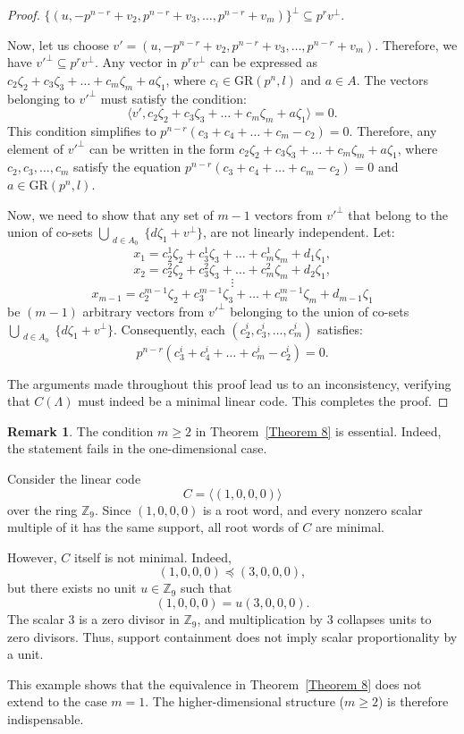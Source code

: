 \documentclass[10pt]{article}
\theoremstyle{definition}
\newtheorem{remark}[lem]{Remark}
\begin{document}
\begin{proof}
$\{ (u, -p^{n-r}+v_2, p^{n-r}+v_3, \ldots, p^{n-r}+v_m) \}^\perp \subseteq p^r v^\perp$.

Now, let us choose $v' = (u, -p^{n-r}+v_2, p^{n-r}+v_3, \ldots, p^{n-r}+v_m)$. Therefore, we have ${v'}^\perp \subseteq p^r v^\perp$. Any vector in $p^r v^\perp$ can be expressed as $c_2 \zeta_2 + c_3 \zeta_3 + \ldots + c_m \zeta_m + a \zeta_1$, where $c_i \in \mathrm{GR}(p^n,l)$ and $ a \in A$. The vectors belonging to $v'^\perp$ must satisfy the condition:
\[\langle v', c_2 \zeta_2 + c_3 \zeta_3 + \ldots +c_m \zeta_m  + a \zeta_1 \rangle = 0.\]
This condition simplifies to $p^{n-r} (c_3 + c_4 + \ldots + c_m - c_2) = 0$. Therefore, any element of $v'^\perp$ can be written in the form $c_2 \zeta_2 + c_3 \zeta_3 + \ldots + c_m \zeta_m + a \zeta_1$, where $c_2, c_3, \ldots, c_m$ satisfy the equation $p^{n-r} (c_3 + c_4 + \ldots + c_m - c_2) = 0$ and $ a \in \mathrm{GR}(p^n,l)$.

Now, we need to show that any set of $m-1$ vectors from $v'^\perp$ that belong to the union of co-sets $\bigcup_{\substack{d \in A_0}} \{d\zeta_1 + v^\perp\}$, are not linearly independent. Let:
$$ x_1 = c_2^1 \zeta_2 + c_3^1 \zeta_3 + \ldots + c_m^1 \zeta_m + d_1 \zeta_1, $$
$$ x_2 = c_2^2 \zeta_2 + c_3^2 \zeta_3 + \ldots + c_m^2 \zeta_m + d_2 \zeta_1, $$
$$ \vdots $$
$$ x_{m-1} = c_2^{m-1} \zeta_2 + c_3^{m-1} \zeta_3 + \ldots + c_m^{m-1} \zeta_m + d_{m-1} \zeta_1 $$
be $(m-1)$ arbitrary vectors from $v'^\perp$ belonging to the union of co-sets $\bigcup_{\substack{d \in A_0}} \{d\zeta_1 + v^\perp\}$. Consequently, each $(c_2^i, c_3^i, \ldots, c_m^i)$ satisfies:
\[ p^{n-r} (c_3^i + c_4^i + \ldots + c_m^i - c_2^i) = 0. \]

The arguments made throughout this proof lead us to an inconsistency, verifying that $C(\Lambda)$ must indeed be a minimal linear code. This completes the proof.
\end{proof}
\begin{remark}
The condition $m \ge 2$ in Theorem~\ref{Theorem 8} is essential.
Indeed, the statement fails in the one-dimensional case.

Consider the linear code
\[
C=\langle (1,0,0,0) \rangle
\]
over the ring $\mathbb{Z}_{9}$.
Since $(1,0,0,0)$ is a root word, and every nonzero scalar multiple of it has the same support, all root words of $C$ are minimal.

However, $C$ itself is not minimal.
Indeed,
\[
(1,0,0,0) \preceq (3,0,0,0),
\]
but there exists no unit $u \in \mathbb{Z}_9$ such that
\[
(1,0,0,0)=u(3,0,0,0).
\]
The scalar $3$ is a zero divisor in $\mathbb{Z}_9$, and multiplication by $3$ collapses units to zero divisors.
Thus, support containment does not imply scalar proportionality by a unit.

This example shows that the equivalence in Theorem~\ref{Theorem 8} does not extend to the case $m=1$.
The higher-dimensional structure ($m \ge 2$) is therefore indispensable.
\end{remark}
\end{document}

